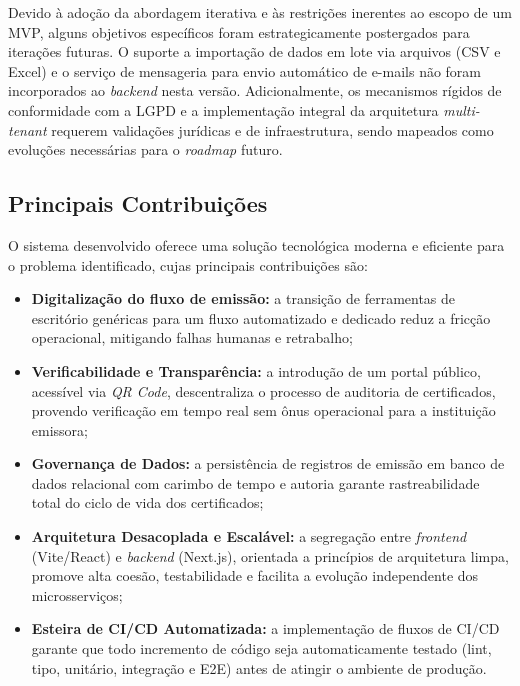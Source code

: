 \documentclass[12pt,openright,oneside,a4paper]{article}
\newcounter{rn}
\begin{document}
Devido à adoção da abordagem iterativa e às restrições inerentes ao escopo de um MVP, alguns objetivos específicos foram estrategicamente postergados para iterações futuras. O suporte a importação de dados em lote via arquivos (CSV e Excel) e o serviço de mensageria para envio automático de e-mails não foram incorporados ao \textit{backend} nesta versão. Adicionalmente, os mecanismos rígidos de conformidade com a LGPD e a implementação integral da arquitetura \textit{multi-tenant} requerem validações jurídicas e de infraestrutura, sendo mapeados como evoluções necessárias para o \textit{roadmap} futuro.

\subsection{Principais Contribuições}

O sistema desenvolvido oferece uma solução tecnológica moderna e eficiente para o problema identificado, cujas principais contribuições são:

\begin{itemize}
    \item \textbf{Digitalização do fluxo de emissão:} a transição de ferramentas de escritório genéricas para um fluxo automatizado e dedicado reduz a fricção operacional, mitigando falhas humanas e retrabalho;
    \item \textbf{Verificabilidade e Transparência:} a introdução de um portal público, acessível via \textit{QR Code}, descentraliza o processo de auditoria de certificados, provendo verificação em tempo real sem ônus operacional para a instituição emissora;
    \item \textbf{Governança de Dados:} a persistência de registros de emissão em banco de dados relacional com carimbo de tempo e autoria garante rastreabilidade total do ciclo de vida dos certificados;
    \item \textbf{Arquitetura Desacoplada e Escalável:} a segregação entre \textit{frontend} (Vite/React) e \textit{backend} (Next.js), orientada a princípios de arquitetura limpa, promove alta coesão, testabilidade e facilita a evolução independente dos microsserviços;
    \item \textbf{Esteira de CI/CD Automatizada:} a implementação de fluxos de CI/CD garante que todo incremento de código seja automaticamente testado (lint, tipo, unitário, integração e E2E) antes de atingir o ambiente de produção.
\end{itemize}
\end{document}
